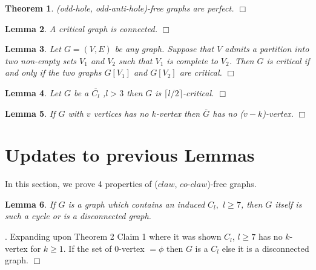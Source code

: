 \documentclass[12pt]{article}
\newtheorem{Theorem}{Theorem}[section]
\newtheorem{Lemma}[Theorem]{Lemma}
\def\CCO{($claw$, $co$-$claw$)}
\begin{document}
\begin{Theorem}\label{thm:StrongPerfect}
(odd-hole, odd-anti-hole)-free graphs are perfect. $\Box$
\end{Theorem}

\begin{Lemma}\label{lem:connected}
A critical graph is connected. $\Box$
\end{Lemma}

\begin{Lemma}\label{lem:join-critical}{\rm \cite{DhaHam2014}}
Let $G=(V,E)$ be any graph.  Suppose that $V$ admits a partition into
two non-empty sets $V_1$ and $V_2$ such that $V_1$ is complete to
$V_2$.  Then $G$ is critical if and only if the two graphs $G[V_1]$
and $G[V_2]$ are critical. $\Box$
\end{Lemma}

\begin{Lemma}\label{lem:anti-hole-critical}{\rm \cite{TEMP}}
Let $G$ be a $\overline{C_l}$ ,$l >3$ then $G$ is $\lceil l/2 \rceil$-critical. $\Box$
\end{Lemma}

\begin{Lemma}\label{lem:complement-k-vertex}
If $G$ with $v$ vertices has no $k$-vertex then $\overline{G}$ has no ($v-k$)-vertex. $\Box$
\end{Lemma}

\section{Updates to previous Lemmas}\label{sec:updates}
In this section, we prove 4 properties of {\CCO}-free graphs.
\begin{Lemma}\label{lem:C7Cycle}
If $G$ is a graph which contains an induced $C_l,$ $l \geq 7$, then $G$ itself is such a cycle or is a disconnected graph.
\end{Lemma}
.  Expanding \cite{BraFud2002} upon Theorem 2 Claim 1 where it was shown $C_l$, $l \geq 7$ has no $k$-vertex for $k \geq 1$. If the set of 0-vertex $= \phi$ then $G$ is a $C_l$ else it is a disconnected graph.  $\Box$

\medskip
\end{document}
